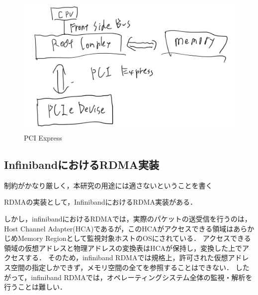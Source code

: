 \begin{figure}[htbp]
    \caption{PCI Express}
    \label{fig:zentai}
    \begin{center}
        \includegraphics[bb=0 0 1000 400,width=15cm]{img/tegaki/pcie.png}
    \end{center}
\end{figure}

\subsection{InfinibandにおけるRDMA実装}

制約がかなり厳しく，本研究の用途には適さないということを書く

RDMAの実装として，Infiniband\cite{islam2012high}におけるRDMA実装がある．

しかし，infinibandにおけるRDMA\cite{infiniband-rdma}では，実際のパケットの送受信を行うのは，Host Channel Adapter(HCA)であるが，このHCAがアクセスできる領域はあらかじめMemory Regionとして監視対象ホストのOSにされている．
アクセスできる領域の仮想アドレスと物理アドレスの変換表はHCAが保持し，変換した上でアクセスする．
そのため，infiniband RDMAでは規格上，許可された仮想アドレス空間の指定しかできず，メモリ空間の全てを参照することはできない．
したがって，infiniband RDMAでは，オペレーティングシステム全体の監視・解析を行うことは難しい．
